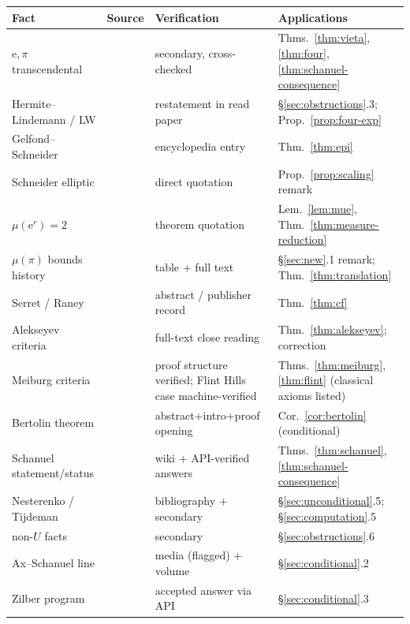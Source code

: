 \documentclass[11pt]{amsart}
\theoremstyle{definition}
\theoremstyle{remark}
\numberwithin{equation}{section}
\newcommand{\irr}{\mu}
\newcommand{\ee}{\mathrm{e}}
\begin{document}
\begin{center}
\footnotesize\begin{tabularx}{\textwidth}{@{}p{}p{}p{}X@{}}
\toprule
Fact & Source & Verification & Applications \\
\midrule
$\ee,\pi$ transcendental & \cite{Hermite1873,Lindemann1882,KepuTrans} & secondary, cross-checked & Thms.~\ref{thm:vieta},\ref{thm:four},\ref{thm:schanuel-consequence} \\
Hermite--Lindemann / LW & \cite{Lindemann1882,Bertolin2026} & restatement in read paper & \S\ref{sec:obstructions}.3; Prop.~\ref{prop:four-exp} \\
Gelfond--Schneider & \cite{GS1934} & encyclopedia entry & Thm.~\ref{thm:epi} \\
Schneider elliptic & \cite{Duke} & direct quotation & Prop.~\ref{prop:scaling} remark \\
$\irr(\ee^r)=2$ & \cite{CNU2024} & theorem quotation & Lem.~\ref{lem:mue}, Thm.~\ref{thm:measure-reduction} \\
$\irr(\pi)$ bounds history & \cite{MathWorldMeasure,Alekseyev2011} & table + full text & \S\ref{sec:new}.1 remark; Thm.~\ref{thm:translation} \\
Serret / Raney & \cite{Panti2017,Raney1973} & abstract / publisher record & Thm.~\ref{thm:cf} \\
Alekseyev criteria & \cite{Alekseyev2011} & full-text close reading & Thm.~\ref{thm:alekseyev}; correction \\
Meiburg criteria & \cite{Meiburg2022} & proof structure verified; Flint Hills case machine-verified & Thms.~\ref{thm:meiburg},\ref{thm:flint} (classical axioms listed) \\
Bertolin theorem & \cite{Bertolin2026} & abstract+intro+proof opening & Cor.~\ref{cor:bertolin} (conditional) \\
Schanuel statement/status & \cite{SchanuelWiki,MO33817} & wiki + API-verified answers & Thms.~\ref{thm:schanuel},\ref{thm:schanuel-consequence} \\
Nesterenko / Tijdeman & \cite{Nesterenko1996,KepuAlgebraic} & bibliography + secondary & \S\ref{sec:unconditional}.5; \S\ref{sec:computation}.5 \\
non-$U$ facts & \cite{KepuAlgebraic} & secondary & \S\ref{sec:obstructions}.6 \\
Ax--Schanuel line & \cite{MPT2019,CambridgeFF} & media (flagged) + volume & \S\ref{sec:conditional}.2 \\
Zilber program & \cite{MO33817} & accepted answer via API & \S\ref{sec:conditional}.3 \\

\end{tabularx}
\end{center}
\end{document}
